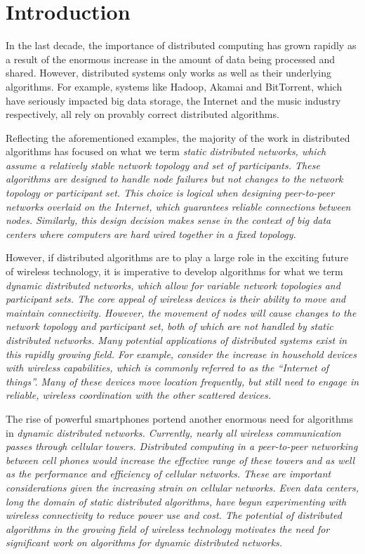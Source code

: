 \documentclass[english]{article}
\begin{document}
\section{Introduction}

In the last decade, the importance of distributed computing has grown rapidly as a result of the enormous increase in the amount of data being processed and shared. However, distributed systems only works as well as their underlying algorithms. For example, systems like Hadoop, Akamai and BitTorrent, which have seriously impacted big data storage, the Internet and the music industry respectively, all rely on provably correct distributed algorithms. 

Reflecting the aforementioned examples, the majority of the work in distributed algorithms has focused on what we term \em static distributed networks\em, which assume a relatively stable network topology and set of participants. These algorithms are designed to handle node failures but not changes to the network topology or participant set. This choice is logical when designing peer-to-peer networks overlaid on the Internet, which guarantees reliable connections between nodes. Similarly, this design decision makes sense in the context of big data centers where computers are hard wired together in a fixed topology. 

However, if distributed algorithms are to play a large role in the exciting future of wireless technology, it is imperative to develop algorithms for what we term \em dynamic distributed networks\em, which allow for variable network topologies and participant sets. The core appeal of wireless devices is their ability to move and maintain connectivity. However, the movement of nodes will cause changes to the network topology and participant set, both of which are not handled by \em static distributed networks\em. Many potential applications of distributed systems exist in this rapidly growing field. For example, consider the increase in household devices with wireless capabilities, which is commonly referred to as the ``Internet of things''. Many of these devices move location frequently, but still need to engage in reliable, wireless coordination with the other scattered devices.

The rise of powerful smartphones portend another enormous need for algorithms in \em dynamic distributed networks\em. Currently, nearly all wireless communication passes through cellular towers. Distributed computing in a peer-to-peer networking between cell phones would increase the effective range of these towers and as well as the performance and efficiency of cellular networks. These are important considerations given the increasing strain on cellular networks. Even data centers, long the domain of static distributed algorithms, have begun experimenting with wireless connectivity to reduce power use and cost. The potential of distributed algorithms in the growing field of wireless technology motivates the need for significant work on algorithms for \em dynamic distributed networks\em.
\end{document}
